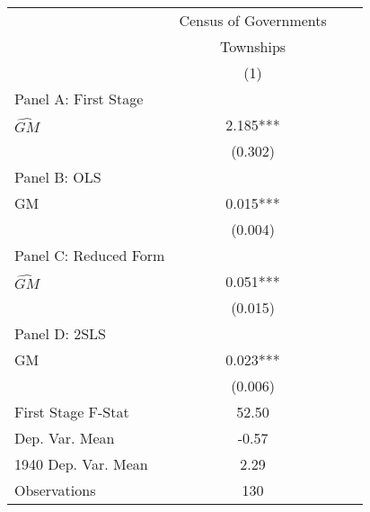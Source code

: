  \begin{tabular}{l*{3}{c}} \toprule
&\multicolumn{1}{c}{Census of Governments}\\\cmidrule(lr){2-2}
&\multicolumn{1}{c}{Townships}\\\cmidrule(lr){2-2}
&\multicolumn{1}{c}{(1)}\\
\cmidrule(lr){1-2}
\multicolumn{1}{l}{Panel A: First Stage}\\
\cmidrule(lr){1-2}
$\widehat{GM}$  &    2.185***\\
                &  (0.302)   \\
\cmidrule(lr){1-2}
\multicolumn{1}{l}{Panel B: OLS}\\
\cmidrule(lr){1-2}
GM              &    0.015***\\
                &  (0.004)   \\
\cmidrule(lr){1-2}
\multicolumn{1}{l}{Panel C: Reduced Form}\\
\cmidrule(lr){1-2}
$\widehat{GM}$  &    0.051***\\
                &  (0.015)   \\
\cmidrule(lr){1-2}
\multicolumn{1}{l}{Panel D: 2SLS}\\
\cmidrule(lr){1-2}
GM              &    0.023***\\
                &  (0.006)   \\
\midrule
First Stage F-Stat&    52.50   \\
Dep. Var. Mean  &    -0.57   \\
1940 Dep. Var. Mean&     2.29   \\
Observations    &      130   \\
 \bottomrule \end{tabular}
